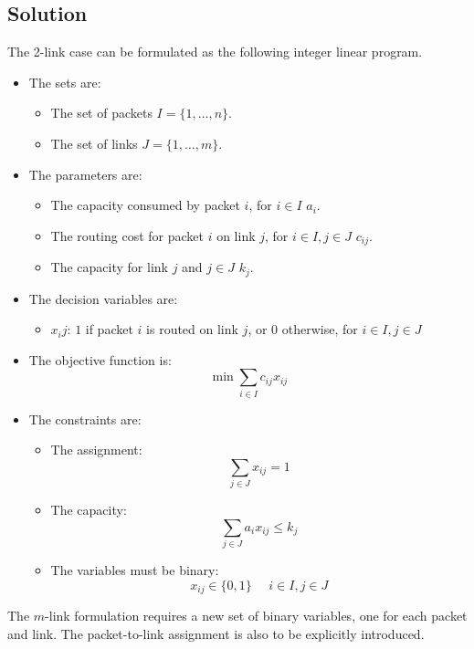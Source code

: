 \documentclass[12pt, a4paper]{report}
\newtheorem[style=M,bodystyle=\normalfont]{theorem}{Theorem}
\newtheorem[style=M,bodystyle=\normalfont]{corollary}{Corollary}
\newtheorem[style=M,bodystyle=\normalfont]{lemma}{Lemma}
\newtheorem[style=M,bodystyle=\normalfont]{definition}{Definition}
\begin{document}
    \subsection*{Solution}
        The 2-link case can be formulated as the following integer linear program. 
        \begin{itemize}
            \item The sets are: 
                \begin{itemize}
                    \item The set of packets $I=\{1,\dots,n\}$. 
                    \item The set of links $J=\{1,\dots,m\}$. 
                \end{itemize}
            \item The parameters are: 
                \begin{itemize}
                    \item The capacity consumed by packet $i$, for $i \in I$ $a_i$.
                    \item The routing cost for packet $i$ on link $j$, for $i \in I,j \in J$ $c_{ij}$.
                    \item The capacity for link $j$ and $j \in J$ $k_{j}$. 
                \end{itemize}
            \item The decision variables are:
                \begin{itemize}
                    \item $x_ij$: $1$ if packet $i$ is routed on link $j$, or 0 otherwise, for $i \in I,j \in J$
                \end{itemize}
            \item The objective function is: 
                \[\min{\sum_{i \in I}{c_{ij}x_{ij}}}\]
            \item The constraints are:
                \begin{itemize}
                    \item The assignment: 
                        \[\sum_{j \in J}x_{ij} = 1\]
                    \item The capacity: 
                        \[\sum_{j \in J}a_ix_{ij} \leq k_j\]
                    \item The variables must be binary: 
                        \[x_{ij} \in \{0,1\} \:\:\:\:\:\: i \in I,j \in J\]
                \end{itemize}
        \end{itemize}
        The $m$-link formulation requires a new set of binary variables, one for each packet and link. The packet-to-link assignment is also to be explicitly introduced. 
\end{document}
